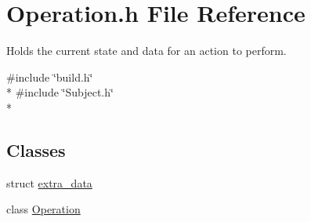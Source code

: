 \section{Operation.\-h File Reference}
\label{_operation_8h}


Holds the current state and data for an action to perform.  


{\ttfamily \#include \char`\"{}build.\-h\char`\"{}}\\*
{\ttfamily \#include \char`\"{}Subject.\-h\char`\"{}}\\*
\subsection*{Classes}
\begin{DoxyCompactItemize}
\item 
struct \hyperlink{structextra__data}{extra\-\_\-data}
\item 
class \hyperlink{class_operation}{Operation}
\end{DoxyCompactItemize}
